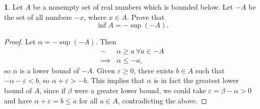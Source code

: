 \documentclass[12pt]{article}
\theoremstyle{definition}
\newtheorem{ex}{}
\begin{document}
\begin{ex}
	Let $A$ be a nonempty set of real numbers which is bounded below.
	Let $-A$ be the set of all numbers $-x$, where $x \in A$.
	Prove that \begin{equation*}
		\inf A = -\sup (-A).
	\end{equation*}
\end{ex}
\begin{proof}
	Let $\alpha = -\sup(-A)$.
	Then \begin{align*}
		-\mathop{} & \alpha \geq a \ \forall a \in -A \\
		\implies   & \alpha \leq -a,
	\end{align*}
	so $\alpha$ is a lower bound of $-A$.
	Given $\varepsilon \geq 0$, there exists $b \in A$ such that $-\alpha - \varepsilon < b$, so $\alpha + \varepsilon > -b$.
	This implies that $\alpha$ is in fact the greatest lower bound of $A$, since if $\beta$ were a greater lower bound, we could take $\varepsilon = \beta - \alpha > 0$ and have $\alpha + \varepsilon = b \leq a$ for all $a \in A$, contradicting the above.
\end{proof}

\break
\end{document}
